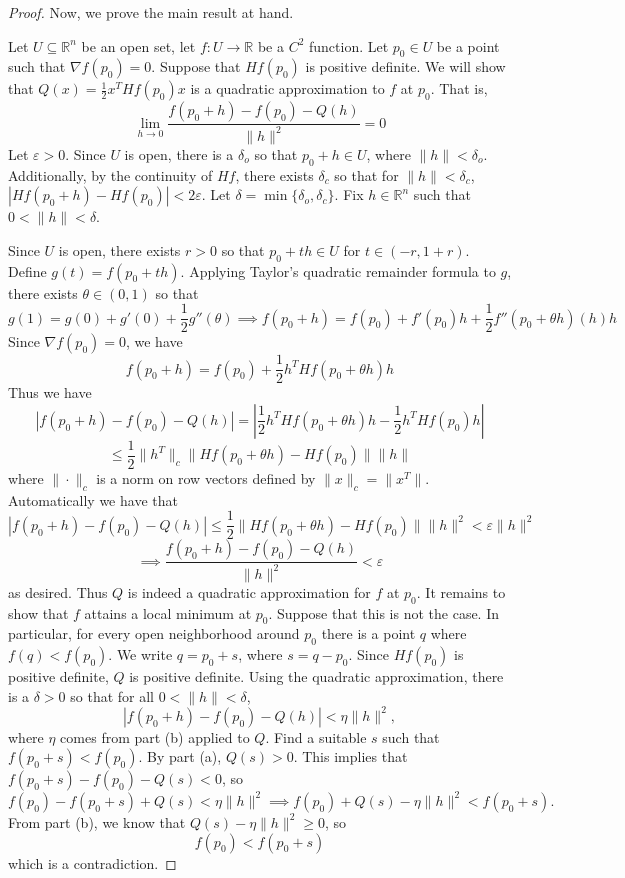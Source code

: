 \documentclass{article}
\theoremstyle{plain} %
\numberwithin{thm}{section} %
\theoremstyle{definition}
\begin{document}
\begin{proof}
        \medskip

        Now, we prove the main result at hand.

        Let \(U \subseteq \mathbb{R}^n\) be an open set, let \(f: U \to \mathbb{R}\) be a \(C^2\) function. Let \(p_0 \in U\) be a point such that \(\nabla f(p_0) = 0\). Suppose that \(Hf(p_0)\) is positive definite. We will show that \(Q(x) = \frac{1}{2}x^T Hf(p_0) x\) is a quadratic approximation to \(f\) at \(p_0\). That is,
        \[
            \lim_{h \to 0} \frac{f(p_0 + h) - f(p_0) - Q(h)}{\|h\|^2} = 0
        \]
        Let \(\varepsilon > 0\). Since \(U\) is open, there is a \(\delta _o\) so that \(p_0 + h \in U\), where \(\|h\| < \delta _o\). Additionally, by the continuity of \(Hf\), there exists \(\delta _c\) so that for \(\|h\| < \delta _c\), \(|Hf(p_0 + h) - Hf(p_0)| < 2\varepsilon\). Let \(\delta = \min \{ \delta _o, \delta _c \}\). Fix \(h \in \mathbb{R}^n\) such that \(0 < \|h\| < \delta\).
        
        Since \(U\) is open, there exists \(r > 0\) so that \(p_0 + th \in U\) for \(t \in (-r, 1 + r)\). Define \(g(t) = f(p_0 + th)\).
        Applying Taylor's quadratic remainder formula to \(g\), there exists \(\theta \in (0, 1)\) so that
        \[
            g(1) = g(0) + g'(0) + \frac{1}{2}g''(\theta) \implies f(p_0 + h) = f(p_0) + f'(p_0)h + \frac{1}{2}f''(p_0 + \theta h)(h)h
        \]
        Since \(\nabla f(p_0) = 0\), we have
        \[
            f(p_0 + h) = f(p_0) + \frac{1}{2}h^T Hf(p_0 + \theta h)h
        \]
        Thus we have
        \[
            |f(p_0 + h) - f(p_0) - Q(h)| = \left\vert \frac{1}{2}h^T Hf(p_0 + \theta h)h - \frac{1}{2}h^T Hf(p_0)h\right\vert
        \]
        \[
            \leq \frac{1}{2}\|h^T\| _c \|Hf(p_0 + \theta h) - Hf(p_0)\| \|h\|
        \]
        where \(\|\cdot\| _c\) is a norm on row vectors defined by \(\|x\| _c = \|x^T\|\). Automatically we have that 
        \[
            |f(p_0 + h) - f(p_0) - Q(h)| \leq \frac{1}{2}\|Hf(p_0 + \theta h) - Hf(p_0)\| \|h\|^2 < \varepsilon \|h\|^2
        \]
        \[
            \implies \frac{f(p_0 + h) - f(p_0) - Q(h)}{\|h\|^2} < \varepsilon
        \]
        as desired. Thus \(Q\) is indeed a quadratic approximation for \(f\) at \(p_0\). It remains to show that \(f\) attains a local minimum at \(p_0\). Suppose that this is not the case. In particular, for every open neighborhood around \(p_0\) there is a point \(q\) where \(f(q) < f(p_0)\). We write \(q = p_0 + s\), where \(s = q - p_0\). Since \(Hf(p_0)\) is positive definite, \(Q\) is positive definite. Using the quadratic approximation, there is a \(\delta > 0\) so that for all \(0 < \|h\| < \delta\),
        \[
            |f(p_0 + h) - f(p_0) - Q(h)| < \eta\|h\|^2,
        \]
        where \(\eta\) comes from part (b) applied to \(Q\). Find a suitable \(s\) such that \(f(p_0 + s) < f(p_0)\). By part (a), \(Q(s) > 0\). This implies that \(f(p_0 + s) - f(p_0) - Q(s) < 0\), so
        \[
            f(p_0) - f(p_0 + s) + Q(s) < \eta \|h\|^2 \implies f(p_0) + Q(s) - \eta \|h\|^2 < f(p_0 + s).
        \]
        From part (b), we know that \(Q(s) - \eta \|h\|^2 \geq 0\), so
        \[
            f(p_0) < f(p_0 + s)
        \]
        which is a contradiction.


\end{proof}
\end{document}
